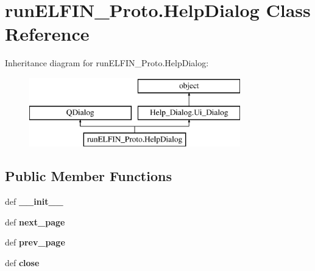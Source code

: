 \hypertarget{classrunELFIN__Proto_1_1HelpDialog}{\section{run\-E\-L\-F\-I\-N\-\_\-\-Proto.\-Help\-Dialog Class Reference}
\label{classrunELFIN__Proto_1_1HelpDialog}
}
Inheritance diagram for run\-E\-L\-F\-I\-N\-\_\-\-Proto.\-Help\-Dialog\-:\begin{figure}[H]
\begin{center}
\leavevmode
\includegraphics[height=3.000000cm]{classrunELFIN__Proto_1_1HelpDialog}
\end{center}
\end{figure}
\subsection*{Public Member Functions}
\begin{DoxyCompactItemize}
\item 
\hypertarget{classrunELFIN__Proto_1_1HelpDialog_af80d32e0edfb5fb4244a16220ba96de2}{def {\bfseries \-\_\-\-\_\-init\-\_\-\-\_\-}}\label{classrunELFIN__Proto_1_1HelpDialog_af80d32e0edfb5fb4244a16220ba96de2}

\item 
\hypertarget{classrunELFIN__Proto_1_1HelpDialog_a9bdb7b0d9ca12b76645a59ce8ad18a06}{def {\bfseries next\-\_\-page}}\label{classrunELFIN__Proto_1_1HelpDialog_a9bdb7b0d9ca12b76645a59ce8ad18a06}

\item 
\hypertarget{classrunELFIN__Proto_1_1HelpDialog_ac62d4e4a3483b9580038506b086e3561}{def {\bfseries prev\-\_\-page}}\label{classrunELFIN__Proto_1_1HelpDialog_ac62d4e4a3483b9580038506b086e3561}

\item 
\hypertarget{classrunELFIN__Proto_1_1HelpDialog_a4af56d945a598a2a03aa8a6de494d87b}{def {\bfseries close}}\label{classrunELFIN__Proto_1_1HelpDialog_a4af56d945a598a2a03aa8a6de494d87b}

\end{DoxyCompactItemize}
